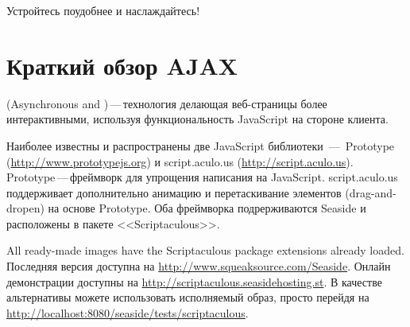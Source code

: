 \documentclass[a4paper,10pt,twoside]{book}
\begin{document}

Устройтесь поудобнее и наслаждайтесь!


\section{Краткий обзор AJAX}



 (Asynchronous  and )\,---\,технология
делающая веб-страницы более интерактивными, используя
функциональность JavaScript на стороне клиента.


Наиболее известны и распространены две JavaScript библиотеки \,---\,
Prototype (\url{http://www.prototypejs.org}) и script.aculo.us
(\url{http://script.aculo.us}).
Prototype\,---\,фреймворк для упрощения написания на JavaScript.
script.aculo.us поддерживает дополнительно анимацию и перетаскивание
элементов (drag-and-dropen) на основе Prototype. Оба фреймворка
подрерживаются Seaside и расположены в пакете <<Scriptaculous>>.


All ready-made images have the Scriptaculous package extensions already loaded.
Последняя версия доступна на \url{http://www.squeaksource.com/Seaside}.
Онлайн демонстрации доступны на \url{http://scriptaculous.seasidehosting.st}.
В качестве альтернативы можете использовать исполняемый образ,
просто перейдя на \url{http://localhost:8080/seaside/tests/scriptaculous}.
\end{document}
